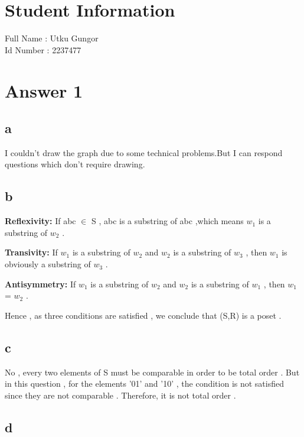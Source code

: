 \documentclass[11pt]{article}
\begin{document}
\section*{Student Information } 
Full Name : Utku Gungor \\
Id Number : 2237477 \\

\section*{Answer 1}
\subsection*{a} 
\hspace{15px} I couldn't draw the graph due to some technical problems.But I can respond questions which don't require drawing.       
\subsection*{b}
\hspace{14px} \textbf{Reflexivity:} If abc $\in$ S , abc is a substring of abc ,which means \textit{$w_1$} is a substring of \textit{$w_2$} .\par 
\textbf{Transivity:} If \textit{$w_1$} is a substring of \textit{$w_2$} and \textit{$w_2$} is a substring of \textit{$w_3$} , then \textit{$w_1$} is obviously a substring of \textit{$w_3$} .   \par 
\textbf{Antisymmetry:} If \textit{$w_1$} is a substring of \textit{$w_2$} and \textit{$w_2$} is a substring of \textit{$w_1$} , then \textit{$w_1$} = \textit{$w_2$} . \par 
Hence , as three conditions are satisfied , we conclude that (S,R) is a poset .
\subsection*{c}
\hspace{15px} No , every two elements of S must be comparable in order to be total order . But in this question , for the elements '01' and '10' , the condition is not satisfied since they are not comparable . Therefore, it is not total order .
\subsection*{d}
\end{document}
